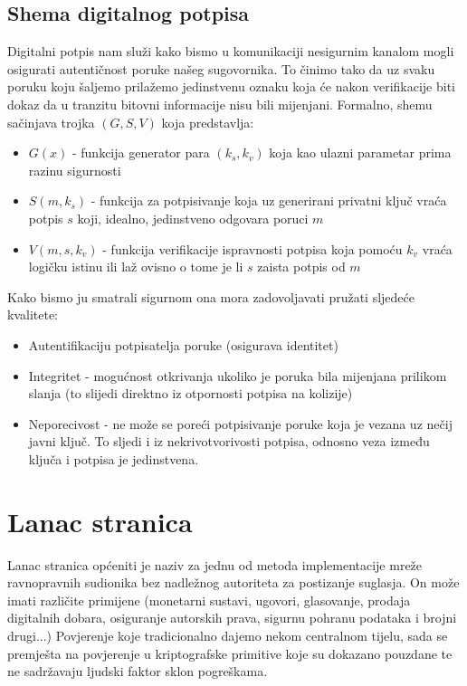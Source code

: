 \documentclass[utf8, zavrsni]{fer}
\begin{document}
\section{Shema digitalnog potpisa}
Digitalni potpis nam služi kako bismo u komunikaciji nesigurnim kanalom mogli osigurati autentičnost poruke našeg sugovornika. To činimo tako da uz svaku poruku koju šaljemo prilažemo jedinstvenu oznaku koja će nakon verifikacije biti dokaz da u tranzitu bitovni informacije nisu bili mijenjani. Formalno, shemu sačinjava trojka $(G, S, V)$ koja predstavlja:
\begin{itemize}
	\item $G(x)$ - funkcija generator para $(k_{s}, k_{v})$ koja kao ulazni parametar prima razinu sigurnosti
	\item $S(m, k_{s})$ - funkcija za potpisivanje koja uz generirani privatni ključ vraća potpis $s$ koji, idealno, jedinstveno odgovara poruci $m$
	\item $V(m, s, k_{v})$ - funkcija verifikacije ispravnosti potpisa koja pomoću $k_{v}$ vraća logičku istinu ili laž ovisno o tome je li $s$ zaista potpis od $m$
\end{itemize}
Kako bismo ju smatrali sigurnom ona mora zadovoljavati pružati sljedeće kvalitete:
\begin{itemize}
	\item Autentifikaciju potpisatelja poruke (osigurava identitet)
	\item Integritet - mogućnost otkrivanja ukoliko je poruka bila mijenjana prilikom slanja (to slijedi direktno iz otpornosti potpisa na kolizije)
	\item Neporecivost - ne može se poreći potpisivanje poruke koja je vezana uz nečij javni ključ. To sljedi i iz nekrivotvorivosti potpisa, odnosno veza između ključa i potpisa je jedinstvena.
\end{itemize}

\chapter{Lanac stranica}
Lanac stranica općeniti je naziv za jednu od metoda implementacije mreže ravnopravnih sudionika bez nadležnog autoriteta za postizanje suglasja. On može imati različite primijene (monetarni sustavi, ugovori, glasovanje, prodaja digitalnih dobara, osiguranje autorskih prava, sigurnu pohranu podataka i brojni drugi...) Povjerenje koje tradicionalno dajemo nekom centralnom tijelu, sada se premješta na povjerenje u kriptografske primitive koje su dokazano pouzdane te ne sadržavaju ljudski faktor sklon pogreškama.
\end{document}
